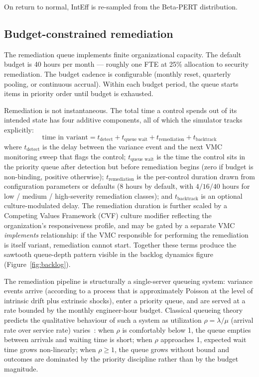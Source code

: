\documentclass[11pt,a4paper]{article}
\begin{document}
On return to normal, IntEff is re-sampled from the Beta-PERT distribution.

\subsection{Budget-constrained remediation}

The remediation queue implements finite organizational capacity. The default budget is 40 hours per month --- roughly one FTE at 25\% allocation to security remediation. The budget cadence is configurable (monthly reset, quarterly pooling, or continuous accrual). Within each budget period, the queue starts items in priority order until budget is exhausted.

Remediation is not instantaneous. The total time a control spends out of its intended state has four additive components, all of which the simulator tracks explicitly:
\begin{equation}
    \text{time in variant} = t_{\text{detect}} + t_{\text{queue wait}} + t_{\text{remediation}} + t_{\text{backtrack}}
    \label{eq:timein}
\end{equation}
where $t_{\text{detect}}$ is the delay between the variance event and the next VMC monitoring sweep that flags the control; $t_{\text{queue wait}}$ is the time the control sits in the priority queue after detection but before remediation begins (zero if budget is non-binding, positive otherwise); $t_{\text{remediation}}$ is the per-control duration drawn from configuration parameters or defaults (8 hours by default, with $4 / 16 / 40$ hours for low / medium / high-severity remediation classes); and $t_{\text{backtrack}}$ is an optional culture-modulated delay. The remediation duration is further scaled by a Competing Values Framework (CVF) culture modifier reflecting the organization's responsiveness profile, and may be gated by a separate VMC \emph{implements} relationship: if the VMC responsible for performing the remediation is itself variant, remediation cannot start. Together these terms produce the sawtooth queue-depth pattern visible in the backlog dynamics figure (Figure~\ref{fig:backlog}).

The remediation pipeline is structurally a single-server queueing system: variance events arrive (according to a process that is approximately Poisson at the level of intrinsic drift plus extrinsic shocks), enter a priority queue, and are served at a rate bounded by the monthly engineer-hour budget. Classical queueing theory predicts the qualitative behaviour of such a system as utilization $\rho = \lambda / \mu$ (arrival rate over service rate) varies~\citep{Little1961, Kleinrock1975}: when $\rho$ is comfortably below 1, the queue empties between arrivals and waiting time is short; when $\rho$ approaches 1, expected wait time grows non-linearly; when $\rho \geq 1$, the queue grows without bound and outcomes are dominated by the priority discipline rather than by the budget magnitude.
\end{document}

